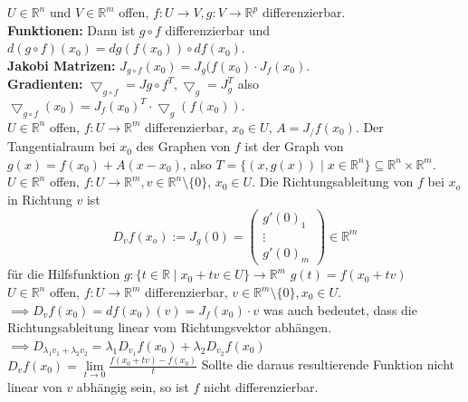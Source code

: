  \(U\in\mathbb R^n\) und \(V\in\mathbb R^m\) offen, \(f:U\rightarrow V, g:V\rightarrow\mathbb R^p\) differenzierbar.\\
\textbf{Funktionen:} 
Dann ist $g\circ f$ differenzierbar und $d(g\circ f)(x_0)=dg(f(x_0))\circ df(x_0)$.\\
\textbf{Jakobi Matrizen:}
\(J_{g\circ f}(x_0)=J_g(f(x_0)\cdot J_f(x_0)\).\\
\textbf{Gradienten:}
\(\bigtriangledown_{g\circ f}=J{g\circ f}^T, \bigtriangledown_g=J_g^T\) also
\(\bigtriangledown_{g\circ f}(x_0)=J_f(x_0)^T\cdot\bigtriangledown_g(f(x_0))\).\\
  \(U\in\mathbb{R}^n\) offen, \(f: U\rightarrow\mathbb{R}^m\) differenzierbar, \(x_0\in U\), \(A=J_/f(x_0)\). Der Tangentialraum bei \(x_0\) des Graphen von \(f\) ist der Graph von \(g(x)=f(x_0)+A(x-x_0)\), also \(T=\{(x,g(x))\mid x\in\mathbb{R}^n\}\subseteq\mathbb{R}^n\times\mathbb{R}^m\).\\
  \(U\in\mathbb{R}^n\) offen, \(f:U\rightarrow \mathbb{R}^m, v\in\mathbb{R}^n\setminus\{0\}\), \(x_0\in U\). Die Richtungsableitung von \(f\) bei \(x_o\) in Richtung \(v\) ist \[D_v f(x_o) := J_g(0)=\begin{pmatrix}g'(0)_1\\\vdots\\g'(0)_m\end{pmatrix}\in\mathbb R^m\] für die Hilfsfunktion \(g : \{t\in\mathbb R\mid x_0 + tv\in U\}\rightarrow \mathbb R ^m\) \(g(t)=f(x_0+tv)\)\\
  \(U\in\mathbb R^n\) offen, \(f:U\rightarrow\mathbb R^m\) differenzierbar, \(v\in\mathbb R^m\setminus\{0\}, x_0\in U\). \\\(\implies D_vf(x_0)=df(x_0)(v)=J_f(x_0)\cdot v\) was auch bedeutet, dass die Richtungsableitung linear vom Richtungsvektor abhängen.\\
  \(\implies D_{\lambda_1v_1+\lambda_2v_2}=\lambda_1D_{v_1}f(x_0)+\lambda_2D_{v_2}f(x_0)\)\\
  \(D_vf(x_0)=\lim\limits_{t\rightarrow0}\frac{f(x_0+tv)-f(x_0)}{t}\) Sollte die
  daraus resultierende Funktion nicht linear von \(v\) abhängig sein, so ist
  \(f\) nicht differenzierbar.
